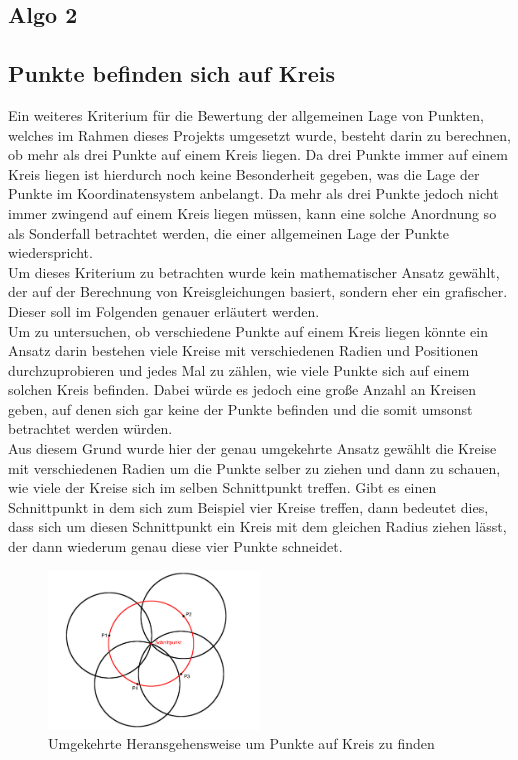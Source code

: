 \documentclass[a4paper,twocolumn]{scrartcl}
\begin{document}
\subsection{Algo 2}

\subsection{Punkte befinden sich auf Kreis}
Ein weiteres Kriterium für die Bewertung der allgemeinen Lage von Punkten, welches im Rahmen dieses Projekts umgesetzt wurde, besteht darin zu berechnen, ob mehr als drei Punkte auf einem Kreis liegen. Da drei Punkte immer auf einem Kreis liegen ist hierdurch noch keine Besonderheit gegeben, was die Lage der Punkte im Koordinatensystem anbelangt. Da mehr als drei Punkte jedoch nicht immer zwingend auf einem Kreis liegen müssen, kann eine solche Anordnung so als Sonderfall betrachtet werden, die einer allgemeinen Lage der Punkte wiederspricht.\\
Um dieses Kriterium zu betrachten wurde kein mathematischer Ansatz gewählt, der auf der Berechnung von Kreisgleichungen basiert, sondern eher ein grafischer. Dieser soll im Folgenden genauer erläutert werden.\\
Um zu untersuchen, ob verschiedene Punkte auf einem Kreis liegen könnte ein Ansatz darin bestehen viele Kreise mit verschiedenen Radien und Positionen durchzuprobieren und jedes Mal zu zählen, wie viele Punkte sich auf einem solchen Kreis befinden. Dabei würde es jedoch eine große Anzahl an Kreisen geben, auf denen sich gar keine der Punkte befinden und die somit umsonst betrachtet werden würden.\\
Aus diesem Grund wurde hier der genau umgekehrte Ansatz gewählt die Kreise mit verschiedenen Radien um die Punkte selber zu ziehen und dann zu schauen, wie viele der Kreise sich im selben Schnittpunkt treffen. Gibt es einen Schnittpunkt in dem sich zum Beispiel vier Kreise treffen, dann bedeutet dies, dass sich um diesen Schnittpunkt ein Kreis mit dem gleichen Radius ziehen lässt, der dann wiederum genau diese vier Punkte schneidet.
 
\begin{figure}[h]
\centering
\includegraphics[width=0.5\textwidth]{Bilder/kreise}
\caption{Umgekehrte Heransgehensweise um Punkte auf Kreis zu finden}
\label{img:kreise}
\end{figure}
\end{document}
